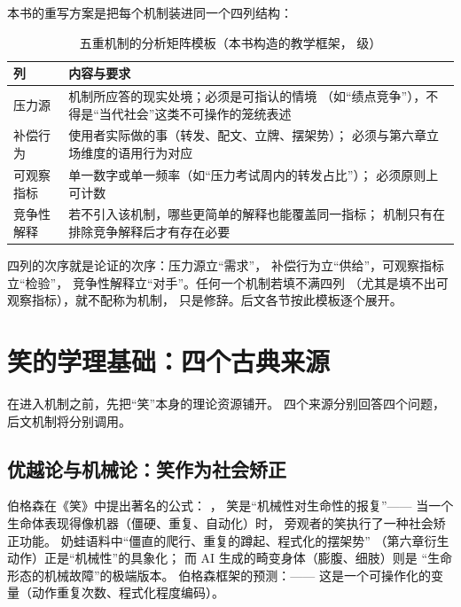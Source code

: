 本书的重写方案是把每个机制装进同一个四列结构：

\begin{table}[htbp]\centering
  \caption{五重机制的分析矩阵模板（本书构造的教学框架， 级）}
  \label{tab:07:matrixtpl}
  \small
  \begin{tabularx}{\textwidth}{@{}lX@{}}
    \toprule
    列 & 内容与要求 \\ \midrule
    压力源 & 机制所应答的现实处境；必须是可指认的情境
      （如“绩点竞争”），不得是“当代社会”这类不可操作的笼统表述 \\
    补偿行为 & 使用者实际做的事（转发、配文、立牌、摆架势）；
      必须与第六章立场维度的语用行为对应 \\
    可观察指标 & 单一数字或单一频率（如“压力考试周内的转发占比”）；
      必须原则上可计数 \\
    竞争性解释 & 若不引入该机制，哪些更简单的解释也能覆盖同一指标；
      机制只有在排除竞争解释后才有存在必要 \\ \bottomrule
  \end{tabularx}
\end{table}

四列的次序就是论证的次序：压力源立“需求”，
补偿行为立“供给”，可观察指标立“检验”，
竞争性解释立“对手”。任何一个机制若填不满四列
（尤其是填不出可观察指标），就不配称为机制，
只是修辞。后文各节按此模板逐个展开。

\section{笑的学理基础：四个古典来源}\label{sec:07:theory}

在进入机制之前，先把“笑”本身的理论资源铺开。
四个来源分别回答四个问题，后文机制将分别调用。

\subsection{优越论与机械论：笑作为社会矫正}

伯格森在《笑》中提出著名的公式：
，
笑是“机械性对生命性的报复”——
当一个生命体表现得像机器（僵硬、重复、自动化）时，
旁观者的笑执行了一种社会矫正功能\cite{bergson1900rire}。
奶蛙语料中“僵直的爬行、重复的蹲起、程式化的摆架势”
（第六章衍生动作）正是“机械性”的具象化；
而 AI 生成的畸变身体（膨腹、细肢）则是
“生命形态的机械故障”的极端版本。
伯格森框架的预测：——
这是一个可操作化的变量（动作重复次数、程式化程度编码）。

